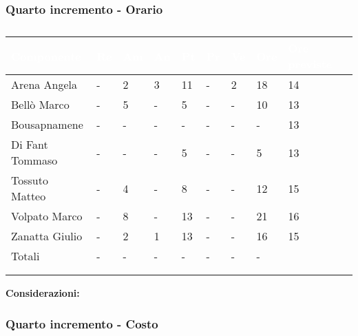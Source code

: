{{        \subsubsection{Quarto incremento - Orario} {
            \setlength{\freewidth}{\dimexpr\textwidth-30\tabcolsep}
            \renewcommand{\arraystretch}{1.0}
            \setlength{\aboverulesep}{0pt}
            \setlength{\belowrulesep}{0pt}
            \begin{longtable}{C{.3\freewidth} C{.1\freewidth} C{.1\freewidth} C{.1\freewidth} C{.1\freewidth} C{.1\freewidth} C{.1\freewidth} C{.1\freewidth} C{.1\freewidth} C{.3\freewidth}}
            \toprule
            \textcolor{white}{\textbf{Componente}}&
            \textcolor{white}{\textbf{Re}}&
            \textcolor{white}{\textbf{Am}}&
            \textcolor{white}{\textbf{An}}&
            \textcolor{white}{\textbf{Pt}}&
            \textcolor{white}{\textbf{Pr}}&
            \textcolor{white}{\textbf{Ve}}&
            \textcolor{white}{\textbf{Ore}}&
            \textcolor{white}{\textbf{Ore previste}} \\
            \toprule
            \endhead
    
            Arena Angela & - & 2 & 3  & 11 & - & 2 & 18 & 14\\      
            Bellò Marco & - & 5 & - & 5 & - & - & 10 & 13\\      
            Bousapnamene & - & - & - & - & - & - & - & 13\\      
            Di Fant Tommaso & - & - & - & 5 & - & - & 5 & 13\\      
            Tossuto Matteo & - & 4 & - & 8 & - & - & 12 & 15\\      
            Volpato Marco & - & 8 & - & 13 & - & - & 21 & 16 \\      
            Zanatta Giulio & - & 2 & 1 & 13 & - & - & 16 & 15 \\      
            Totali & - & - & - & - & - & - & - \\
            \bottomrule
            \\
            \caption{}
    
            \end{longtable} 
            \textbf{Considerazioni:} 
        }
        \subsubsection{Quarto incremento - Costo} {}

}}

